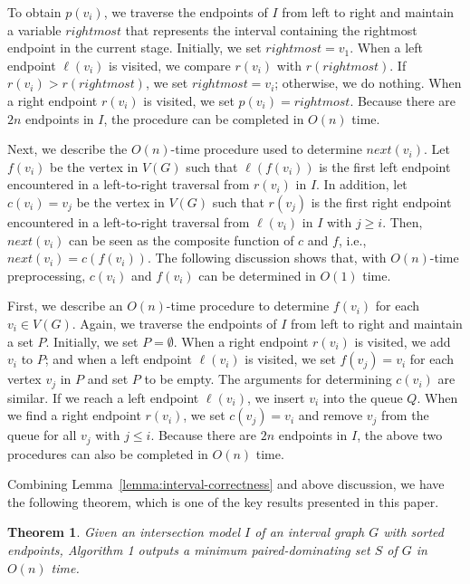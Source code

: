 \documentclass[12pt]{article}
\newtheorem{theorem}{Theorem}
\begin{document}
To obtain $p(v_i)$, we traverse the endpoints of $I$ from left to
right and maintain a variable $rightmost$ that represents the
interval containing the rightmost endpoint in the current stage.
Initially, we set $rightmost = v_1$. When a left endpoint
$\ell(v_i)$ is visited, we compare $r(v_i)$ with $r(rightmost)$.
If $r(v_i) > r(rightmost)$, we set $rightmost = v_i$; otherwise,
we do nothing. When a right endpoint $r(v_i)$ is visited, we set
$p(v_i) = rightmost$. Because there are $2n$ endpoints in $I$, the
procedure can be completed in $O(n)$ time.

Next, we describe the $O(n)$-time procedure used to determine
$next(v_i)$. Let $f(v_i)$ be the vertex in $V(G)$ such that
$\ell(f(v_i))$ is the first left endpoint encountered in a
left-to-right traversal from $r(v_i)$ in $I$. In addition, let
$c(v_i) = v_j$ be the vertex in $V(G)$ such that $r(v_j)$ is the
first right endpoint encountered in a left-to-right traversal from
$\ell(v_i)$ in $I$ with $j \ge i$. Then, $next(v_i)$ can be seen
as the composite function of $c$ and $f$, i.e., $next(v_i) =
c(f(v_i))$. The following discussion shows that, with $O(n)$-time
preprocessing, $c(v_i)$ and $f(v_i)$ can be determined in $O(1)$
time.

First, we describe an $O(n)$-time procedure to determine $f(v_i)$
for each $v_i \in V(G)$. Again, we traverse the endpoints of $I$
from left to right and maintain a set $P$. Initially, we set $P =
\emptyset$. When a right endpoint $r(v_i)$ is visited, we add
$v_i$ to $P$; and when a left endpoint $\ell(v_i)$ is visited, we
set $f(v_j) = v_i$ for each vertex $v_j$ in $P$ and set $P$ to be
empty. The arguments for determining $c(v_i)$ are similar. If we
reach a left endpoint $\ell(v_i)$, we insert $v_i$ into the queue
$Q$. When we find a right endpoint $r(v_i)$, we set $c(v_j)=v_i$
and remove $v_j$ from the queue for all $v_j$ with $j \le i$.
Because there are $2n$ endpoints in $I$, the above two procedures
can also be completed in $O(n)$ time.

Combining Lemma~\ref{lemma:interval-correctness} and above
discussion, we have the following theorem, which is one of the key
results presented in this paper.

\begin{theorem} \label{theorem:interval} Given an intersection
model $I$ of an interval graph $G$ with sorted endpoints,
Algorithm 1 outputs a minimum paired-dominating set $S$ of $G$ in
$O(n)$ time.
\end{theorem}
\end{document}
